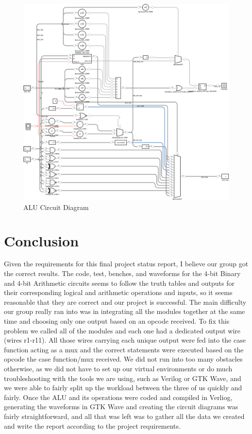 \documentclass[runningheads, 12pt]{report}
\begin{document}
\begin{figure}[h]
	\centering
	\includegraphics[height=0.67\textheight,width=1.0\textwidth]{alu_circuit}
	\caption{ALU Circuit Diagram}
	\label{fig: alu_circuit}
\end{figure}
\pagebreak

\section{Conclusion}

	Given the requirements for this final project status report, I believe our group got the correct results. The code, test, benches, and waveforms for the 4-bit Binary and 4-bit Arithmetic circuits seems to follow the truth tables and outputs for their corresponding logical and arithmetic operations and inputs, so it seems reasonable that they are correct and our project is successful. The main difficulty our group really ran into was in integrating all the modules together at the same time and choosing only one output based on an opcode received. To fix this problem we called all of the modules and each one had a dedicated output wire (wires r1-r11). All those wires carrying each unique output were fed into the case function acting as a mux and the correct statements were executed based on the opcode the case function/mux received. We did not run into too many obstacles otherwise, as we did not have to set up our virtual environments or do much troubleshooting with the tools we are using, such as Verilog or GTK Wave, and we were able to fairly split up the workload between the three of us quickly and fairly. Once the ALU and its operations were coded and compiled in Verliog, generating the waveforms in GTK Wave and creating the circuit diagrams was fairly straightforward, and all that was left was to gather all the data we created and write the report according to the project requirements.  


 
	
\end{document}
